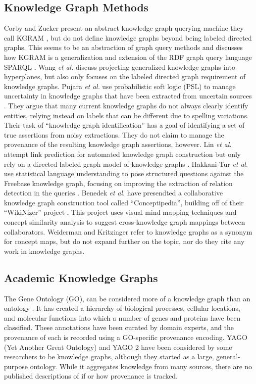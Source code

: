 \subsection{Knowledge Graph Methods}
Corby and Zucker present an abstract knowledge graph querying machine they call KGRAM \cite{Corby_2010}, but do not define knowledge graphs beyond being labeled directed graphs.
This seems to be an abstraction of graph query methods and discusses how KGRAM is a generalization and extension of the RDF graph query language SPARQL \cite{harris2013sparql}.
Wang \emph{et al.} \cite{Wang_knowledgegraph} discuss projecting generalized knowledge graphs into hyperplanes, but also only focuses on the labeled directed graph requirement of knowledge graphs.
Pujara \emph{et al.} use probabilistic soft logic (PSL) to manage uncertainty in knowledge graphs that have been extracted from uncertain sources \cite{Pujara_2013}. 
They argue that many current knowledge graphs do not always clearly identify entities, relying instead on labels that can be different due to spelling variations.
Their task of ``knowledge graph identification'' has a goal of identifying a set of true assertions from noisy extractions.
They do not claim to manage the provenance of the resulting knowledge graph assertions, however.
Lin \emph{et al.} attempt link prediction for automated knowledge graph construction but only rely on a directed labeled graph model of knowledge graphs \cite{lin2015learning}.
Hakkani-Tur \emph{et al.} use statistical language understanding to pose structured questions against the Freebase knowledge graph, focusing on improving the extraction of relation detection in the queries \cite{Hakkani_Tur_2013}.
Benedek \emph{et al.} have presendted a collaborative knowledge graph construction tool called  ``Conceptipedia'', building off of their ``WikiNizer'' project .
This project uses visual mind mapping techniques and concept similarity analysis to suggest cross-knowledge graph mappings between collaborators.
Weiderman and Kritzinger \cite{} refer to knowledge graphs as a synonym for concept maps, but do not expand further on the topic, nor do they cite any work in knowledge graphs.
 

\subsection{Academic Knowledge Graphs}
The Gene Ontology (GO), can be considered more of a knowledge graph than an ontology \cite{Ashburner_2000}.
It has created a hierarchy of biological processes, cellular locations, and molecular functions into which a number of genes and proteins have been classified.
These annotations have been curated by domain experts, and the provenance of each is recorded using a GO-specific provenance encoding.
YAGO (Yet Another Great Ontology) \cite{Suchanek_2007} and YAGO 2 \cite{Hoffart_2013} have been considered by some researchers to be knowledge graphs, although they started as a large, general-purpose ontology.
While it aggregates knowledge from many sources, there are no published descriptions of if or how provenance is tracked. 

